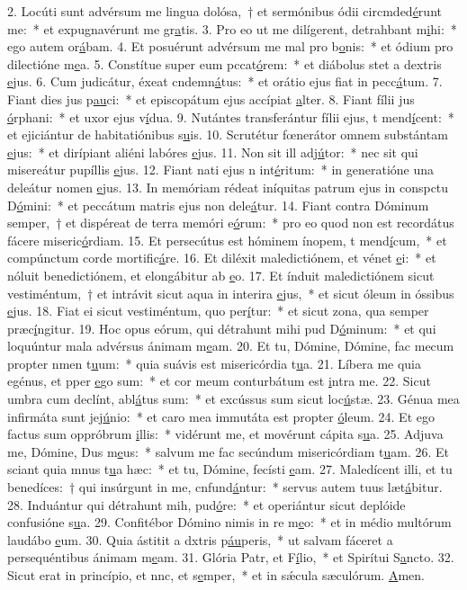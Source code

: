 2. Locúti sunt advérsum me lingua dolósa,~† et sermónibus ódii circmded\uline{é}runt me:~* et expugnavérunt me gr\uline{a}tis.
3. Pro eo ut me dilígerent, detrahbant m\uline{i}hi:~* ego autem or\uline{á}bam.
4. Et posuérunt advérsum me mal pro b\uline{o}nis:~* et ódium pro dilectióne m\uline{e}a.
5. Constítue super eum pccat\uline{ó}rem:~* et diábolus stet a dextris \uline{e}jus.
6. Cum judicátur, éxeat cndemn\uline{á}tus:~* et orátio ejus fiat in pecc\uline{á}tum.
7. Fiant dies jus p\uline{au}ci:~* et episcopátum ejus accípiat \uline{a}lter.
8. Fiant fílii jus \uline{ó}rphani:~* et uxor ejus v\uline{í}dua.
9. Nutántes transferántur fílii ejus, t mend\uline{í}cent:~* et ejiciántur de habitatiónibus s\uline{u}is.
10. Scrutétur fœnerátor omnem substántam \uline{e}jus:~* et dirípiant aliéni labóres \uline{e}jus.
11. Non sit ill adj\uline{ú}tor:~* nec sit qui misereátur pupíllis \uline{e}jus.
12. Fiant nati ejus n int\uline{é}ritum:~* in generatióne una deleátur nomen \uline{e}jus.
13. In memóriam rédeat iníquitas patrum ejus in conspctu D\uline{ó}mini:~* et peccátum matris ejus non dele\uline{á}tur.
14. Fiant contra Dóminum semper,~† et dispéreat de terra memóri e\uline{ó}rum:~* pro eo quod non est recordátus fácere miseric\uline{ó}rdiam.
15. Et persecútus est hóminem ínopem, t mend\uline{í}cum,~* et compúnctum corde mortific\uline{á}re.
16. Et diléxit maledictiónem, et vénet \uline{e}i:~* et nóluit benedictiónem, et elongábitur ab \uline{e}o.
17. Et índuit maledictiónem sicut vestiméntum,~† et intrávit sicut aqua in interira \uline{e}jus,~* et sicut óleum in óssibus \uline{e}jus.
18. Fiat ei sicut vestiméntum, quo per\uline{í}tur:~* et sicut zona, qua semper præc\uline{í}ngitur.
19. Hoc opus eórum, qui détrahunt mihi pud D\uline{ó}minum:~* et qui loquúntur mala advérsus ánimam m\uline{e}am.
20. Et tu, Dómine, Dómine, fac mecum propter nmen t\uline{u}um:~* quia suávis est misericórdia t\uline{u}a.
21. Líbera me quia egénus, et pper \uline{e}go sum:~* et cor meum conturbátum est \uline{i}ntra me.
22. Sicut umbra cum declínt, abl\uline{á}tus sum:~* et excússus sum sicut loc\uline{ú}stæ.
23. Génua mea infirmáta sunt  jej\uline{ú}nio:~* et caro mea immutáta est propter \uline{ó}leum.
24. Et ego factus sum oppróbrum \uline{i}llis:~* vidérunt me, et movérunt cápita s\uline{u}a.
25. Adjuva me, Dómine, Dus m\uline{e}us:~* salvum me fac secúndum misericórdiam t\uline{u}am.
26. Et sciant quia mnus t\uline{u}a hæc:~* et tu, Dómine, fecísti \uline{e}am.
27. Maledícent illi, et tu benedíces:~† qui insúrgunt in me, cnfund\uline{á}ntur:~* servus autem tuus læt\uline{á}bitur.
28. Induántur qui détrahunt mih, pud\uline{ó}re:~* et operiántur sicut deplóide confusióne s\uline{u}a.
29. Confitébor Dómino nimis in re m\uline{e}o:~* et in médio multórum laudábo \uline{e}um.
30. Quia ástitit a dxtris p\uline{áu}peris,~* ut salvam fáceret a persequéntibus ánimam m\uline{e}am.
31. Glória Patr, et F\uline{í}lio,~* et Spirítui S\uline{a}ncto.
32. Sicut erat in princípio, et nnc, et s\uline{e}mper,~* et in sǽcula sæculórum. \uline{A}men.

